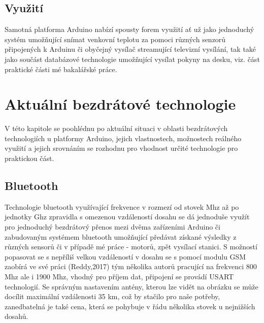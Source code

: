 \documentclass[FM,BP]{tulthesis}
\begin{document}
\section {Využití}
Samotná platforma Arduino nabízí spousty forem využití ať už jako jednoduchý systém umožňující snímat venkovní teplotu za pomoci různých senzorů připojených k Arduinu či obyčejný vysílač streamující televizní vysílání, tak také jako součást databázové technologie umožňující vysílat pokyny na desku, viz. část praktické části mé bakalářské práce.
\chapter {Aktuální bezdrátové technologie}
V této kapitole se poohlédnu po aktuální situaci v oblasti bezdrátových technologiích u platformy Arduino, jejich vlastnostech, možnostech reálného využití a jejich srovnáním se rozhodnu pro vhodnost určité technologie pro praktickou část.


\section {Bluetooth}
Technologie bluetooth využívající frekvence v rozmezí od stovek Mhz až po jednotky Ghz zpravidla s omezenou vzdáleností dosahu se dá jednoduše využít pro jednoduchý bezdrátový přenos mezi dvěma zařízeními Arduino či zabudovaným systémem bluetooth umožňující předávat získané výsledky z různých sensorů či v případě mé práce - motorů, zpět vysílací stanici.  S možností popasovat se s nepříliš velkou vzdáleností v dosahu se s pomocí modulu GSM zaobírá ve své práci (Reddy,2017) tým několika autorů pracující na frekvenci 800 Mhz ale i 1900 Mhz, vhodný pro příjem dat, připojení se provádí USART technologií. Se správným nastavením antény, kterou lze vidět na obrázku  se může docílit maximální vzdálenosti 35 km, což by stačilo pro naše potřeby, zanedbatelná je také cena, která se pohybuje v řádu několika stovek u nejnižších dosahů.

 
\end{document}
